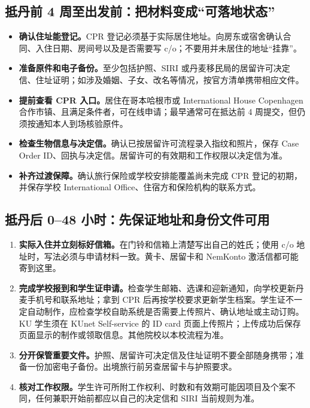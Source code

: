 \subsection{抵丹前 4 周至出发前：把材料变成“可落地状态”}

\begin{itemize}[leftmargin=2em,itemsep=3pt]
  \item \textbf{确认住址能登记。}CPR 登记必须基于实际居住地址。向房东或宿舍确认合同、入住日期、房间号以及是否需要写 c/o；不要用并未居住的地址“挂靠”。
  \item \textbf{准备原件和电子备份。}至少包括护照、SIRI 或丹麦移民局的居留许可决定信、住址证明；如涉及婚姻、子女、改名等情况，按官方清单携带相应文件。
  \item \textbf{提前查看 CPR 入口。}居住在哥本哈根市或 International House Copenhagen 合作市镇、且满足条件者，可在线申请；最早通常可在抵达前 4 周提交，但仍须按通知本人到场核验原件。
  \item \textbf{检查生物信息与决定信。}确认已按居留许可流程录入指纹和照片，保存 Case Order ID、回执与决定信。居留许可的有效期和工作权限以决定信为准。
  \item \textbf{补齐过渡保障。}确认旅行保险或学校安排能覆盖尚未完成 CPR 登记的初期，并保存学校 International Office、住宿方和保险机构的联系方式。
\end{itemize}

\subsection{抵丹后 0--48 小时：先保证地址和身份文件可用}

\begin{enumerate}[leftmargin=2.2em,itemsep=3pt]
  \item \textbf{实际入住并立刻标好信箱。}在门铃和信箱上清楚写出自己的姓氏；使用 c/o 地址时，写法必须与申请材料一致。黄卡、居留卡和 NemKonto 激活信都可能寄到这里。
  \item \textbf{完成学校报到和学生证申请。}检查学生邮箱、选课和迎新通知，向学校更新丹麦手机号和联系地址；拿到 CPR 后再按学校要求更新学生档案。学生证不一定自动制作，应检查学校自助系统是否需要上传照片、确认地址或主动订购。KU 学生须在 KUnet Self-service 的 ID card 页面上传照片；上传成功后保存页面显示的制作或领取信息。其他院校以本校流程为准。
  \item \textbf{分开保管重要文件。}护照、居留许可决定信及住址证明不要全部随身携带；准备一份加密电子备份。出境旅行前另查居留卡与护照要求。
  \item \textbf{核对工作权限。}学生许可所附工作权利、时数和有效期可能因项目及个案不同，任何兼职开始前都应以自己的决定信和 SIRI 当前规则为准。
\end{enumerate}

